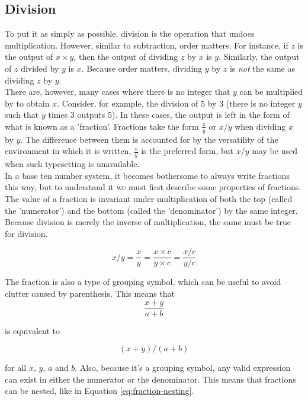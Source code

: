 \subsection{Division}
To put it as simply as possible, division is the operation that undoes multiplication. However, similar to subtraction, order matters. For instance, if $z$ is the output of $x\times y$, then the output of dividing $z$ by $x$ is $y$. Similarly, the output of $z$ divided by $y$ is $x$. Because order matters, dividing $y$ by $z$ is \emph{not} the same as dividing $z$ by $y$.\\

There are, however, many cases where there is no integer that $y$ can be multiplied by to obtain $x$. Consider, for example, the division of $5$ by $3$ (there is no integer $y$ such that $y$ times 3 outputs 5). In these cases, the output is left in the form of what is known as a 'fraction'. Fractions take the form $\frac{x}{y}$ or $x/y$ when dividing $x$ by $y$. The difference between them is accounted for by the versatility of the environment in which it is written, $\frac{x}{y}$ is the preferred form, but $x/y$ may be used when such typesetting is unavailable. \\
In a base ten number system, it becomes bothersome to always write fractions this way, but to understand it we must first describe some properties of fractions. \\
The value of a fraction is invariant under multiplication of both the top (called the 'numerator') and the bottom (called the 'denominator') by the same integer. Because division is merely the inverse of multiplication, the same must be true for division.

\begin{equation}
x / y = \frac{x}{y} = \frac{x\times c}{y \times c} = \frac{x / c}{y / c}
\end{equation}

The fraction is also a type of grouping symbol, which can be useful to avoid clutter caused by parenthesis. This means that
\begin{equation}
\frac{x+y}{a+b}
\end{equation}

is equivalent to

\begin{equation}
(x+y)/(a+b)
\end{equation}

for all $x$, $y$, $a$ and $b$. Also, because it's a grouping symbol, any valid expression can exist in either the numerator or the denominator. This means that fractions can be nested, like in Equation \ref{eq:fraction-nesting}.

